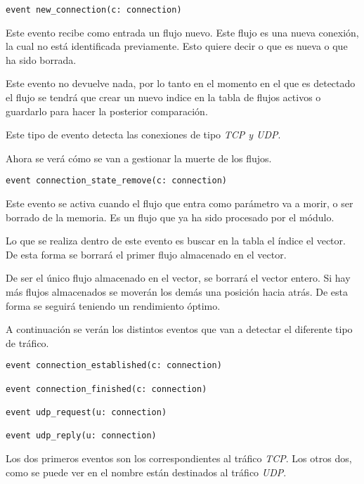 \begin{lstlisting}[style=CodigoC]
event new_connection(c: connection)

\end{lstlisting}

\intro Este evento recibe como entrada un flujo nuevo. Este flujo es una nueva conexión, la cual no está identificada 
previamente. Esto quiere decir o que es nueva o que ha sido borrada.

\intro Este evento no devuelve nada, por lo tanto en el momento en el que es detectado el flujo se tendrá que crear 
un nuevo indice en la tabla de flujos activos o guardarlo para hacer la posterior comparación.

\intro Este tipo de evento detecta las conexiones de tipo \textit{TCP y UDP}.

\intro Ahora se verá cómo se van a gestionar la muerte de los flujos.

\begin{lstlisting}[style=CodigoC]
event connection_state_remove(c: connection)

\end{lstlisting}

\intro Este evento se activa cuando el flujo que entra como parámetro va a morir, o ser borrado de la memoria. Es un flujo 
que ya ha sido procesado por el módulo.

\intro Lo que se realiza dentro de este evento es buscar en la tabla el índice el vector. De esta forma 
se borrará el primer flujo almacenado en el vector.

\intro De ser el único flujo almacenado en el vector, se borrará el vector entero. Si hay más flujos almacenados 
se moverán los demás una posición hacia atrás. De esta forma se seguirá teniendo un rendimiento óptimo.

\intro A continuación se verán los distintos eventos que van a detectar el diferente tipo de tráfico.

\begin{lstlisting}[style=CodigoC]
event connection_established(c: connection)

event connection_finished(c: connection)

event udp_request(u: connection)

event udp_reply(u: connection)

\end{lstlisting}

\intro Los dos primeros eventos son los correspondientes al tráfico \textit{TCP}. Los otros dos, como se puede ver 
en el nombre están destinados al tráfico \textit{UDP}.

